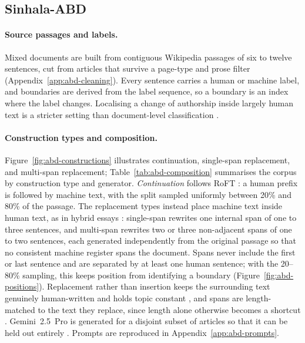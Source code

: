 %
%

\subsection{Sinhala-ABD}
\label{sec:abd-construction}

\paragraph{Source passages and labels.}
Mixed documents are built from contiguous Wikipedia passages of six to twelve
sentences, cut from articles that survive a page-type and prose filter
(Appendix~\ref{app:abd-cleaning}). Every sentence carries a human or machine
label, and boundaries are derived from the label sequence, so a boundary is an
index where the label changes. Localising a change of authorship inside largely
human text is a stricter setting than document-level classification
\citep{wang2024semeval,zeng2024aaai}.

\paragraph{Construction types and composition.}
Figure~\ref{fig:abd-constructions} illustrates continuation, single-span
replacement, and multi-span replacement; Table~\ref{tab:abd-composition}
summarises the corpus by construction type and generator. \emph{Continuation}
follows RoFT \citep{dugan2022roft}: a human prefix is followed by machine text,
with the split sampled uniformly between 20\% and 80\% of the passage. The
replacement types instead place machine text inside human text, as in hybrid
essays \citep{zeng2024aaai,gao2024llm}: single-span rewrites one internal span
of one to three sentences, and multi-span rewrites two or three non-adjacent
spans of one to two sentences, each generated independently from the original
passage so that no consistent machine register spans the document. Spans never
include the first or last sentence and are separated by at least one human
sentence; with the 20--80\% sampling, this keeps position from identifying a
boundary (Figure~\ref{fig:abd-positions}). Replacement rather than insertion
keeps the surrounding text genuinely human-written and holds topic constant
\citep{wang2024m4}, and spans are length-matched to the text they replace, since
length alone otherwise becomes a shortcut \citep{doughman2024limitations}.
Gemini~2.5~Pro is generated for a disjoint subset of articles so that it can be
held out entirely \citep{macko2023multitude}. Prompts are reproduced in
Appendix~\ref{app:abd-prompts}.


